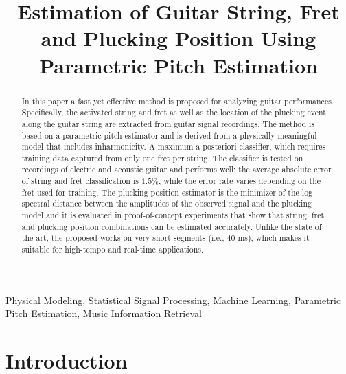 \documentclass{article}
\title{Estimation of Guitar String, Fret and Plucking Position Using Parametric Pitch Estimation}
\begin{document}
\ninept
\maketitle
%
%
%
%
\begin{abstract}
In this paper a fast yet effective method is proposed for analyzing guitar performances. Specifically, the activated string and fret as well as the location of the plucking event along the guitar string are extracted from guitar signal recordings. The method is based on a parametric pitch estimator and is derived from a physically meaningful model that includes inharmonicity. A maximum a posteriori classifier, which requires training data captured from only one fret per string. The classifier is tested on recordings of electric and acoustic guitar and performs well: the average absolute error of string and fret classification is $1.5\%$, while the error rate varies depending on the fret used for training. The plucking position estimator is the minimizer of the log spectral distance between the amplitudes of the observed signal and the plucking model and it is evaluated in proof-of-concept experiments that show that string, fret and plucking position combinations can be estimated accurately. Unlike the state of the art, the proposed works on very short segments (i.e., 40 ms), which makes it suitable for high-tempo and real-time applications.
\end{abstract}
%
\begin{keywords}
 Physical Modeling, Statistical Signal Processing, Machine Learning, Parametric Pitch Estimation, Music Information Retrieval\vspace{-.8mm}
\end{keywords}
%
%
%
%
%
%
%
%
% 
% 
%
\section{Introduction} %
\label{sec:introduction}
\vspace{-.6mm}
%
\end{document}

